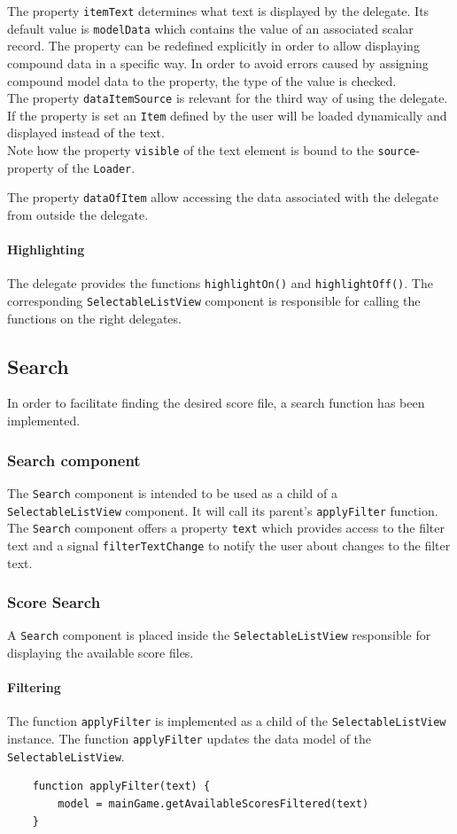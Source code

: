 The property {\tt itemText} determines what text is displayed by the delegate. Its default value is {\tt modelData} which contains the value of an associated scalar record. The property can be redefined explicitly in order to allow displaying compound data in a specific way. In order to avoid errors caused by assigning compound model data to the property, the type of the value is checked. \\
The property {\tt dataItemSource} is relevant for the third way of using the delegate. If the property is set an {\tt Item} defined by the user will be loaded dynamically and displayed instead of the text. \\
Note how the property {\tt visible} of the text element is bound to the {\tt source}-property of the {\tt Loader}.

The property {\tt dataOfItem} allow accessing the data associated with the delegate from outside the delegate. 
\paragraph{Highlighting}
The delegate provides the functions {\tt highlightOn()} and {\tt highlightOff()}. The corresponding {\tt SelectableListView} component is responsible for calling the functions on the right delegates.

\subsection{Search}
In order to facilitate finding the desired score file, a search function has been implemented.
\subsubsection{Search component}
The {\tt Search} component is intended to be used as a child of a {\tt SelectableListView} component. It will call its parent's {\tt applyFilter} function. The {\tt Search} component offers a property {\tt text} which provides access to the filter text and a signal {\tt filterTextChange} to notify the user about changes to the filter text.
\subsubsection{Score Search}
A {\tt Search} component is placed inside the {\tt SelectableListView} responsible for displaying the available score files.
\paragraph{Filtering}
The function {\tt applyFilter} is implemented as a child of the {\tt SelectableListView} instance. The function {\tt applyFilter} updates the data model of the {\tt SelectableListView}. 
\begin{lstlisting}
	function applyFilter(text) {
	    model = mainGame.getAvailableScoresFiltered(text)
	}
\end{lstlisting}

